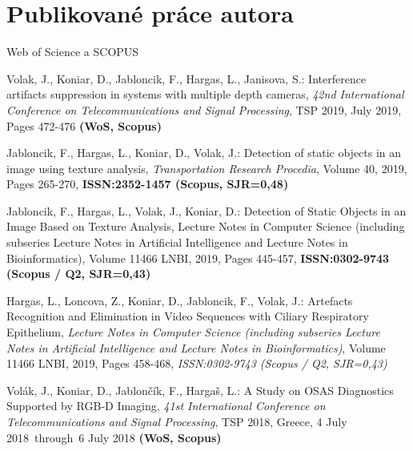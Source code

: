 \chapter{Publikované práce autora} 
\label{kap:Publikacie}

\pagestyle{fancy}
\fancyhf{}
\fancyfoot[CE,CO]{\thepage}
\renewcommand{\footrulewidth}{1pt}

\begin{center}
	\LARGE Web of Science a SCOPUS 
\end{center}


\noindent Volak, J., Koniar, D., Jabloncik, F., Hargas, L., Janisova, S.: Interference artifacts suppression in systems with multiple depth cameras, \textit{42nd International Conference on Telecommunications and Signal Processing}, TSP 2019, July 2019, Pages 472-476 \textbf{(WoS, Scopus)} \newline

\noindent Jabloncik, F., Hargas, L., Koniar, D., Volak, J.: Detection of static objects in an image using texture analysis, \textit{Transportation Research Procedia}, Volume 40, 2019, Pages 265-270, \textbf{ISSN:2352-1457 (Scopus,  SJR=0,48)} \newline

\noindent Jabloncik, F., Hargas, L., Volak, J., Koniar, D.: Detection of Static Objects in an Image Based on Texture Analysis, Lecture Notes in Computer Science (including subseries Lecture Notes in Artificial Intelligence and Lecture Notes in Bioinformatics), Volume 11466 LNBI, 2019, Pages 445-457, \textbf{ISSN:0302-9743 (Scopus / Q2, SJR=0,43)} \newline


\noindent Hargas, L., Loncova, Z., Koniar, D., Jabloncik, F., Volak, J.: Artefacts Recognition and Elimination in Video Sequences with Ciliary Respiratory Epithelium, \textit{Lecture Notes in Computer Science (including subseries Lecture Notes in Artificial Intelligence and Lecture Notes in Bioinformatics)}, Volume 11466 LNBI, 2019, Pages 458-468, \textit{ISSN:0302-9743 (Scopus / Q2, SJR=0,43)} \newline

\newpage

\noindent Volák, J., Koniar, D., Jablončík, F., Hargaš, L.: A Study on OSAS Diagnostics Supported by RGB-D Imaging, \textit{41st International Conference on Telecommunications and Signal Processing}, TSP 2018, Greece, 4 July 2018 through 6 July 2018 \textbf{(WoS, Scopus)} \newline

